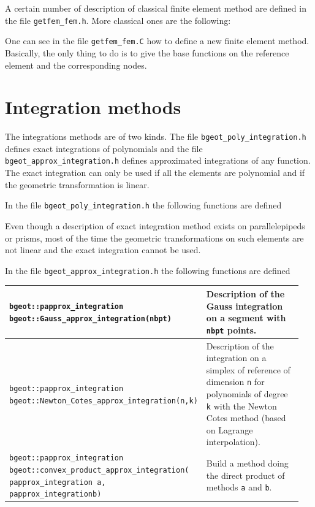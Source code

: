 \documentclass[11pt,a4paper]{article}
\begin{document}
A certain number of description of classical finite element method are defined in the file {\tt getfem\_fem.h}. More classical ones are the following:



One can see in the file {\tt getfem\_fem.C} how to define a new finite element method. Basically, the only thing to do is to give the base functions on the reference element and the corresponding nodes.

\section{Integration methods}

The integrations methods are of two kinds. The file {\tt bgeot\_poly\_integration.h} defines exact integrations of polynomials and the file {\tt bgeot\_approx\_integration.h} defines approximated integrations of any function. The exact integration can only be used if all the elements are polynomial and if the geometric transformation is linear.

In the file {\tt bgeot\_poly\_integration.h} the following functions are defined



Even though a description of exact integration method exists on parallelepipeds or prisms, most of the time the geometric transformations on such elements are not linear and the exact integration cannot be used.

In the file {\tt bgeot\_approx\_integration.h} the following functions are defined

\begin{center} \begin{tabular}{|m{0.55\linewidth}|m{0.4\linewidth}|} \hline
{\tt bgeot::papprox\_integration bgeot::Gauss\_approx\_integration(nbpt)} & Description of the Gauss integration on a segment with {\tt nbpt} points. \\ \hline
{\tt bgeot::papprox\_integration bgeot::Newton\_Cotes\_approx\_integration(n,\;k)} & Description of the integration on a simplex of reference of dimension {\tt n} for polynomials of degree {\tt k} with the Newton Cotes method (based on Lagrange interpolation).\\ \hline
{\tt bgeot::papprox\_integration bgeot::convex\_product\_approx\_integration( papprox\_integration a, papprox\_integration\;b)} & Build a method doing the direct product of methods {\tt a} and {\tt b}. \\ \hline
\end{tabular} \end{center}
\end{document}
